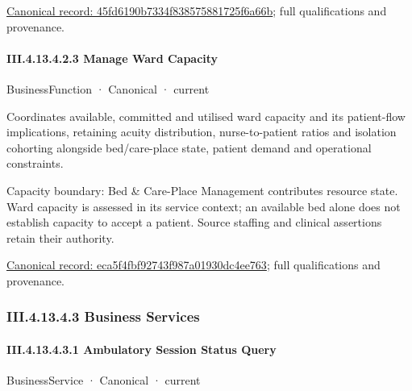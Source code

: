 {\footnotesize \href{../../../../continuum/business/business-function/45fd6190b7334f838575881725f6a66b.md}{Canonical record: 45fd6190b7334f838575881725f6a66b}; full qualifications and provenance.}\par
\paragraph*{III.4.13.4.2.3 Manage Ward Capacity}
\label{navigation:III.4.13.4.2.3}

\label{element:eca5f4fbf92743f987a01930dc4ee763}
{\small BusinessFunction · Canonical · current}\par

Coordinates available, committed and utilised ward capacity and its patient-flow implications, retaining acuity distribution, nurse-to-patient ratios and isolation cohorting alongside bed/care-place state, patient demand and operational constraints.



Capacity boundary: Bed \& Care-Place Management contributes resource state. Ward capacity is assessed in its service context; an available bed alone does not establish capacity to accept a patient. Source staffing and clinical assertions retain their authority.


{\footnotesize \href{../../../../continuum/business/business-function/eca5f4fbf92743f987a01930dc4ee763.md}{Canonical record: eca5f4fbf92743f987a01930dc4ee763}; full qualifications and provenance.}\par
\subsubsection*{III.4.13.4.3 Business Services}
\label{navigation:III.4.13.4.3}

\paragraph*{III.4.13.4.3.1 Ambulatory Session Status Query}
\label{navigation:III.4.13.4.3.1}

\label{element:a790a785f2e148d7a1c99655d53db4e9}
{\small BusinessService · Canonical · current}\par

